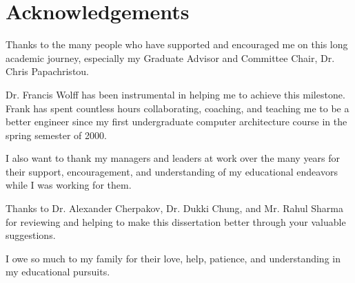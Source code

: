 \chapter*{Acknowledgements}{
\pagestyle{plain} %

Thanks to the many people who have supported and encouraged me on this long
academic journey, especially my Graduate Advisor and Committee Chair, Dr. Chris
Papachristou.

Dr. Francis Wolff has been instrumental in helping me to achieve this milestone.
Frank has spent countless hours collaborating, coaching, and teaching me to be a
better engineer since my first undergraduate computer architecture course in the
spring semester of 2000.

I also want to thank my managers and leaders at work over the many years for
their support, encouragement, and understanding of my educational endeavors
while I was working for them.

Thanks to Dr. Alexander Cherpakov, Dr. Dukki Chung, and Mr. Rahul Sharma for
reviewing and helping to make this dissertation better through your valuable
suggestions.

I owe so much to my family for their love, help, patience, and understanding in
my educational pursuits.

\thispagestyle{plain} %
}
